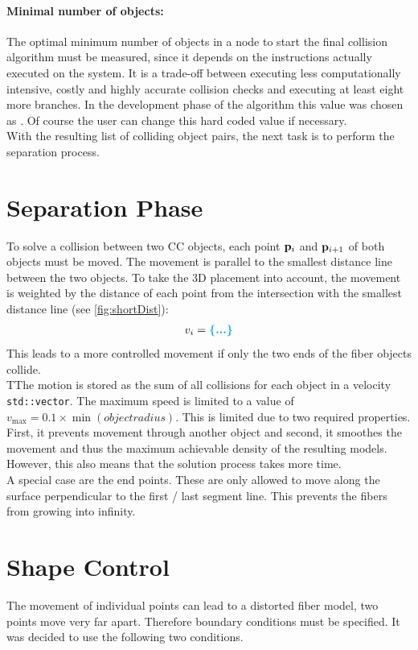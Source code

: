 \paragraph{Minimal number of objects:}
The optimal minimum number of objects in a node to start the final collision algorithm must be measured, since it depends on the instructions actually executed on the system.
It is a trade-off between executing less computationally intensive, costly and highly accurate collision checks and executing at least eight more branches.
In the development phase of the algorithm this value was chosen as \dummy.
Of course the user can change this hard coded value if necessary. 
\\
% 
With the resulting list of colliding object pairs, the next task is to perform the separation process.
%
\section{Separation Phase}
To solve a collision between two \ac{CC} objects, each point $\mathbf{p}_i$ and $\mathbf{p}_{i+1}$ of both objects must be moved.
The movement is parallel to the smallest distance line between the two objects.
To take the 3D placement into account, the movement is weighted by the distance of each point from the intersection with the smallest distance line (see \cref{fig:shortDist}):
\begin{align}
v_i = \dummy
\end{align}
This leads to a more controlled movement if \eg only the two ends of the fiber objects collide.
\\
% 
TThe motion is stored as the sum of all collisions for each object in a velocity \texttt{std::vector}.
The maximum speed is limited to a value of $v_{\max} = 0.1 \times \min(\mathit{object radius})$.
This is limited due to two required properties. First, it prevents movement through another object and second, it smoothes the movement and thus the maximum achievable density of the resulting models.
However, this also means that the solution process takes more time.
\\
% 
A special case are the end points.
These are only allowed to move along the surface perpendicular to the first / last segment line.
This prevents the fibers from growing into infinity.
% 
\section{Shape Control}\label{chap5:ShapeControl}
The movement of individual points can lead to a distorted fiber model, \eg two points move very far apart.
Therefore boundary conditions must be specified.
It was decided to use the following two conditions.
% 
